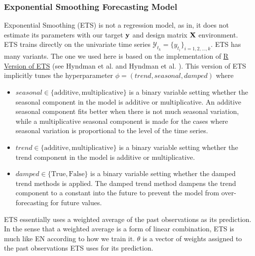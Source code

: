 \subsubsection{Exponential Smoothing Forecasting Model}
Exponential Smoothing (ETS) is not a regression model, as in, it does not estimate its parameters with our target $\mathbf{y}$ and design matrix $\mathbf{X}$ environment. ETS trains directly on the univariate time series $\mathcal{Y}_{t_k} = \{ y_{t_i}\}_{i = 1, 2, \ldots, k}$. ETS has many variants. The one we used here is based on the implementation of \href{https://www.rdocumentation.org/packages/forecast/versions/8.12/topics/ets}{R Version of ETS} (see Hyndman et al. \citeyear{hyndman2008admissible} and Hyndman et al. \citeyear{hyndman2008forecasting}). This version of ETS implicitly tunes the hyperparameter $\phi = (trend, seasonal, damped)$ where
\begin{itemize}
    \item $seasonal \in \{ \text{additive}, \text{multiplicative} \}$ is a binary variable setting whether the seasonal component in the model is additive or multiplicative. An additive seasonal component fits better when there is not much seasonal variation, while a multiplicative seasonal component is made for the cases where seasonal variation is proportional to the level of the time series.
    \item $trend \in \{ \text{additive}, \text{multiplicative} \}$ is a binary variable setting whether the trend component in the model is additive or multiplicative.
    \item $damped \in \{ \text{True}, \text{False} \}$ is a binary variable setting whether the damped trend methods is applied. The damped trend method dampens the trend component to a constant into the future to prevent the model from over-forecasting for future values.
\end{itemize}
ETS essentially uses a weighted average of the past observations as its prediction. In the sense that a weighted average is a form of linear combination, ETS is much like EN according to how we train it. $\theta$ is a vector of weights assigned to the past observations ETS uses for its prediction.

\begin{comment}
    \subsubsection{Moving Average}
    A simple Moving Average (MA) model is used as a benchmark. MA is simple an average of the past observations. The number of past observations used for the averaging is parameterised by $\theta = (q)$. Note that for $q = 1$, if MA is a \textit{naive forecasting} - MA uses the latest observation as its prediction.
\end{comment}
